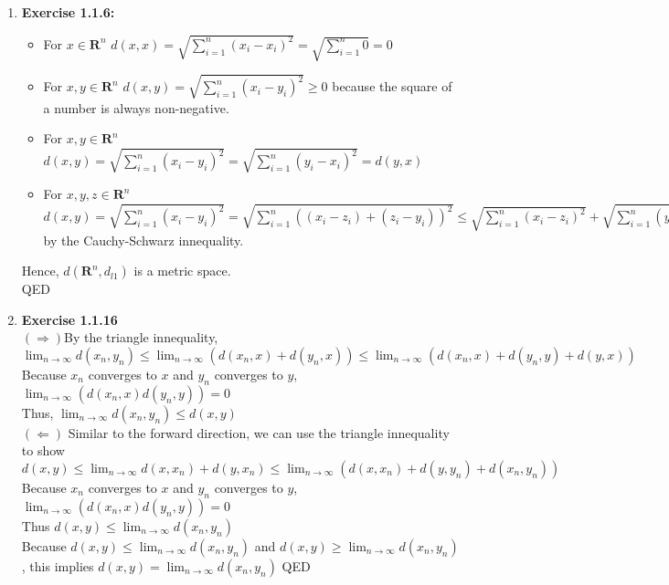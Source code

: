 \documentclass[10pt]{article}
\begin{document}
\begin{enumerate}[label=\bfseries Problem \arabic*:]
    QED
    \newpage
    \item \textbf{Exercise 1.1.6:}
    \begin{itemize}
        \item [a)] For $x\in \mathbf{R}^n$ $d(x,x)=\sqrt{\displaystyle{\sum_{i=1}^{n}}(x_i-x_i)^2}=\sqrt{\displaystyle{\sum_{i=1}^{n}}0}=0$
        \item [b)] For $x,y\in \mathbf{R}^n$ $d(x,y)=\sqrt{\displaystyle{\sum_{i=1}^{n}}(x_i-y_i)^2}\ge0$ because the square of a number is always non-negative.
        \item [c)] For $x,y\in \mathbf{R}^n$ $d(x,y)=\sqrt{\displaystyle{\sum_{i=1}^{n}}(x_i-y_i)^2}=\sqrt{\displaystyle{\sum_{i=1}^{n}}(y_i-x_i)^2}=d(y,x)$
        \item [d)] For $x,y,z\in \mathbf{R}^n$ $d(x,y)=\sqrt{\displaystyle{\sum_{i=1}^{n}}(x_i-y_i)^2}=\sqrt{\displaystyle{\sum_{i=1}^{n}}((x_i-z_i)+(z_i-y_i))^2}\le\sqrt{\displaystyle{\sum_{i=1}^{n}}(x_i-z_i)^2}+\sqrt{\displaystyle{\sum_{i=1}^{n}}(y_i-z_i)^2}=d(x,z)+d(y,z)$ by the Cauchy-Schwarz innequality.
    \end{itemize}
    Hence, $d(\mathbf{R}^n,d_{l1})$ is a metric space.\\
    QED
    
    \item \textbf{Exercise 1.1.16}\\
    $(\Rightarrow)$By the triangle innequality, $\displaystyle{\lim_{n\rightarrow\infty}} d(x_n,y_n)\le \displaystyle{\lim_{n\rightarrow\infty}} (d(x_n,x)+d(y_n,x))\le \displaystyle{\lim_{n\rightarrow\infty}} (d(x_n,x)+d(y_n,y)+d(y,x))$\\
    Because $x_n$ converges to $x$ and $y_n$ converges to $y$, $\displaystyle{\lim_{n\rightarrow\infty}}(d(x_n,x)d(y_n,y))=0$\\
    Thus, $\displaystyle{\lim_{n\rightarrow\infty}} d(x_n,y_n)\le d(x,y)$\\
    $(\Leftarrow)$ Similar to the forward direction, we can use the triangle innequality to show $d(x,y)\le\displaystyle{\lim_{n\rightarrow\infty}}d(x,x_n)+d(y,x_n)\le\displaystyle{\lim_{n\rightarrow\infty}}(d(x,x_n)+d(y,y_n)+d(x_n,y_n))$\\
    Because $x_n$ converges to $x$ and $y_n$ converges to $y$, $\displaystyle{\lim_{n\rightarrow\infty}}(d(x_n,x)d(y_n,y))=0$\\
    Thus $d(x,y)\le \displaystyle{\lim_{n\rightarrow\infty}} d(x_n,y_n)$\\
    Because $d(x,y)\le \displaystyle{\lim_{n\rightarrow\infty}} d(x_n,y_n)$ and $d(x,y)\ge \displaystyle{\lim_{n\rightarrow\infty}} d(x_n,y_n)$, this implies $d(x,y)=\displaystyle{\lim_{n\rightarrow\infty}} d(x_n,y_n)$
    QED
    

\end{enumerate}
\end{document}
